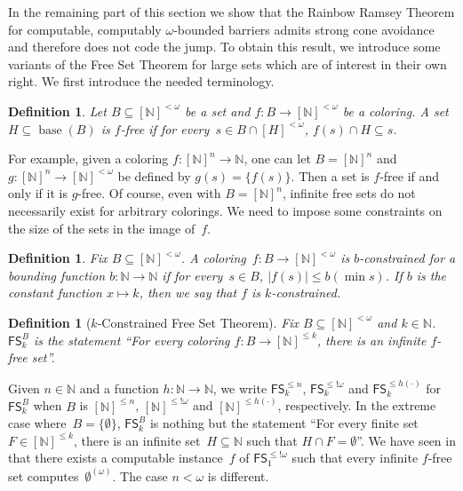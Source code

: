 \documentclass{article}
\newcommand{\FS}[0]{\mathsf{FS}}
\newcommand{\NN}[0]{\mathbb{N}}
\newcommand{\base}{\operatorname{base}}
\def\qt#1{``#1''}%
\numberwithin{theorem}{section}
\newtheorem{definition}[theorem]{Definition}
\begin{document}
In the remaining part of this section we show that the Rainbow Ramsey Theorem for computable, computably $\omega$-bounded barriers admits strong cone avoidance and therefore does not code the jump. To obtain this result, we introduce some variants of the Free Set Theorem for large sets which are of interest in their own right. We first introduce the needed terminology.

\begin{definition}
Let $B \subseteq [\NN]^{<\omega}$ be a set and $f : B \to [\NN]^{<\omega}$ be a coloring.
A set~$H \subseteq \base(B)$ is \emph{$f$-free} if for every~$s \in B \cap [H]^{<\omega}$, $f(s) \cap H \subseteq s$.
\end{definition}

For example, given a coloring $f : [\NN]^n \to \NN$, one can let $B = [\NN]^n$ and $g : [\NN]^n \to [\NN]^{<\omega}$ be defined by $g(s) = \{f(s)\}$. Then a set is $f$-free if and only if it is $g$-free.
Of course, even with $B = [\NN]^n$, infinite free sets do not necessarily exist for arbitrary colorings. We need to impose some constraints on the size of the sets in the image of~$f$.

\begin{definition}
Fix $B \subseteq [\NN]^{<\omega}$.
A coloring~$f : B \to [\NN]^{<\omega}$ is \emph{$b$-constrained} for a bounding function $b : \NN \to \NN$ if for every~$s \in B$, $|f(s)| \leq b(\min s)$. If $b$ is the constant function $x \mapsto k$, then we say that $f$ is \emph{$k$-constrained}.
\end{definition}



\begin{definition}[$k$-Constrained Free Set Theorem]
Fix $B \subseteq [\NN]^{<\omega}$ and $k \in \NN$.
$\FS^B_k$ is the statement \qt{For every coloring  $f : B \to [\NN]^{\leq k}$, there is an infinite $f$-free set}.
\end{definition}

Given $n \in \NN$ and a function $h : \NN \to \NN$, we write $\FS^{\leq n}_k$, $\FS^{\leq !\omega}_k$ and $\FS^{\leq h(\cdot)}_k$ for $\FS^B_k$ when $B$ is $[\NN]^{\leq n}$, $[\NN]^{\leq !\omega}$ and $[\NN]^{\leq h(\cdot)}$, respectively.
In the extreme case where~$B = \{\emptyset\}$, $\FS^B_k$ is nothing but the statement \qt{For every finite set $F \in [\NN]^{\leq k}$, there is an infinite set~$H \subseteq \NN$ such that $H \cap F = \emptyset$}. We have seen in  that there exists a computable instance~$f$ of $\FS^{\leq !\omega}_1$ such that every infinite $f$-free set computes~$\emptyset^{(\omega)}$. The case $n < \omega$ is different.
\end{document}

